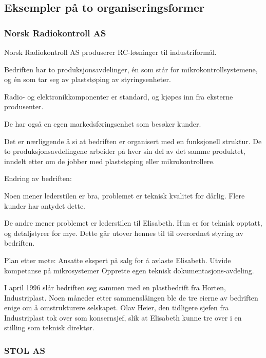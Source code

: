 
\subsection{Eksempler på to organiseringsformer}

\subsubsection{Norsk Radiokontroll AS}


Norsk Radiokontroll AS produserer RC-løsninger til industriformål.

Bedriften har to produksjonsavdelinger, én som står for mikrokontrollsystemene, og én som tar seg av plaststøping av styringsenheter.

Radio- og elektronikkomponenter er standard, og kjøpes inn fra eksterne produsenter.

De har også en egen markedsføringsenhet som besøker kunder.

Det er nærliggende å si at bedriften er organisert med en funksjonell struktur.
De to produksjonsavdelingene arbeider på hver sin del av det samme produktet, inndelt etter om de jobber med plaststøping eller mikrokontrollere.

Endring av bedriften:

Noen mener lederstilen er bra, problemet er teknisk kvalitet for dårlig.
Flere kunder har antydet dette.

De andre mener problemet er lederstilen til Elisabeth.
Hun er for teknisk opptatt, og detaljstyrer for mye.
Dette går utover hennes til til overordnet styring av bedriften.

Plan etter møte:
Ansatte ekspert på salg for å avlaste Elisabeth.
Utvide kompetanse på mikrosystemer
Opprette egen teknisk dokumentasjons-avdeling.

I april 1996 slår bedriften seg sammen med en plastbedrift fra Horten, Industriplast.
Noen måneder etter sammenslåingen ble de tre eierne av bedriften enige om å omstrukturere selskapet. Olav Heier, den tidligere sjefen fra Industriplast tok over som konsernsjef, slik at Elisabeth kunne tre over i en stilling som teknisk direktør.


\subsubsection{STOL AS}

